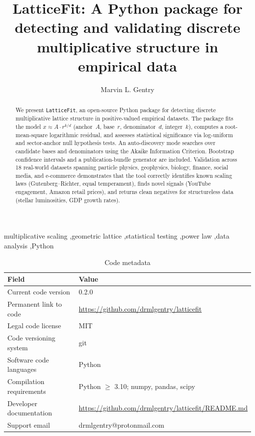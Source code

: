 \documentclass[preprint,12pt]{elsarticle}
\begin{document}
\begin{frontmatter}

\title{LatticeFit: A Python package for detecting and validating
discrete multiplicative structure in empirical data}

\author{Marvin L. Gentry}
\address{Independent Researcher, Seattle, WA, USA}

\begin{abstract}
We present \texttt{LatticeFit}, an open-source Python package for
detecting discrete multiplicative lattice structure in positive-valued
empirical datasets. The package fits the model $x \approx A \cdot
r^{k/d}$ (anchor~$A$, base~$r$, denominator~$d$, integer~$k$),
computes a root-mean-square logarithmic residual, and assesses
statistical significance via log-uniform and sector-anchor null
hypothesis tests. An auto-discovery mode searches over candidate
bases and denominators using the Akaike Information Criterion.
Bootstrap confidence intervals and a publication-bundle generator
are included. Validation across 18 real-world datasets spanning
particle physics, geophysics, biology, finance, social media, and
e-commerce demonstrates that the tool correctly identifies known
scaling laws (Gutenberg--Richter, equal temperament), finds novel
signals (YouTube engagement, Amazon retail prices), and returns
clean negatives for structureless data (stellar luminosities, GDP
growth rates).
\end{abstract}

\begin{keyword}
multiplicative scaling \sep geometric lattice \sep statistical testing
\sep power law \sep data analysis \sep Python
\end{keyword}

\end{frontmatter}

\begin{table}[h]
\centering
\caption{Code metadata}
\label{tab:meta}
\begin{tabular}{lp{8cm}}
\toprule
\textbf{Field} & \textbf{Value} \\
\midrule
Current code version & 0.2.0 \\
Permanent link to code & \url{https://github.com/drmlgentry/latticefit} \\
Legal code license & MIT \\
Code versioning system & git \\
Software code languages & Python \\
Compilation requirements & Python $\geq$ 3.10; numpy, pandas, scipy \\
Developer documentation & \url{https://github.com/drmlgentry/latticefit/README.md} \\
Support email & drmlgentry@protonmail.com \\
\bottomrule
\end{tabular}
\end{table}
\end{document}
